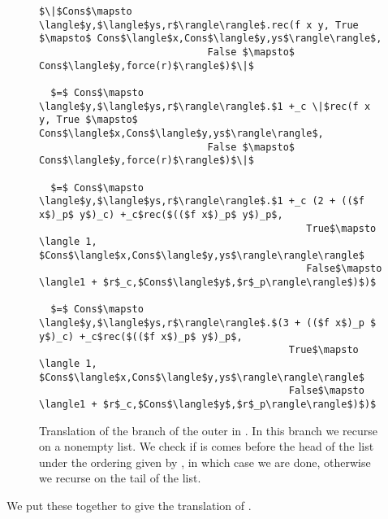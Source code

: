 \begin{figure}[H]
\caption{Translation of the  branch of the outer  in .
In this branch we recurse on a nonempty list.
We check if  is comes before the head of the list under the ordering given by , in which case we are done, 
  otherwise we recurse on the tail of the list.
}
\label{fig:insert_cons}
\begin{lstlisting}
$\|$Cons$\mapsto \langle$y,$\langle$ys,r$\rangle\rangle$.rec(f x y, True $\mapsto$ Cons$\langle$x,Cons$\langle$y,ys$\rangle\rangle$,
                             False $\mapsto$ Cons$\langle$y,force(r)$\rangle$)$\|$

  $=$ Cons$\mapsto \langle$y,$\langle$ys,r$\rangle\rangle$.$1 +_c \|$rec(f x y, True $\mapsto$ Cons$\langle$x,Cons$\langle$y,ys$\rangle\rangle$,
                             False $\mapsto$ Cons$\langle$y,force(r)$\rangle$)$\|$

  $=$ Cons$\mapsto \langle$y,$\langle$ys,r$\rangle\rangle$.$1 +_c (2 + (($f x$)_p$ y$)_c) +_c$rec($(($f x$)_p$ y$)_p$,
                                              True$\mapsto \langle 1, $Cons$\langle$x,Cons$\langle$y,ys$\rangle\rangle\rangle$
                                              False$\mapsto \langle1 + $r$_c,$Cons$\langle$y$,$r$_p\rangle\rangle$)$)$

  $=$ Cons$\mapsto \langle$y,$\langle$ys,r$\rangle\rangle$.$(3 + (($f x$)_p $ y$)_c) +_c$rec($(($f x$)_p$ y$)_p$,
                                           True$\mapsto \langle 1, $Cons$\langle$x,Cons$\langle$y,ys$\rangle\rangle\rangle$
                                           False$\mapsto \langle1 + $r$_c,$Cons$\langle$y$,$r$_p\rangle\rangle$)$)$
\end{lstlisting}
\end{figure}
%
We put these together to give the translation of .
%
